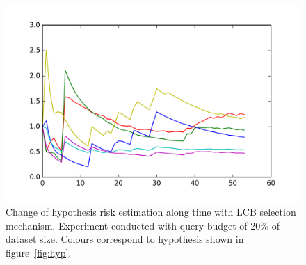 \documentclass[12pt, a4paper, pdflatex, leqno]{report}
\begin{document}
\begin{figure}[htbp]
  \centering
  \includegraphics[width=0.7\linewidth]{graphics/convergence_LCB025.png}
  \begin{tiny}
    \caption{Change of hypothesis risk estimation along time with LCB selection mechanism. Experiment conducted with query budget of 20\% of dataset size. Colours correspond to hypothesis shown in figure~\ref{fig:hyp}.\label{fig:LCB_conv}}
  \end{tiny}
  \vspace{1cm}
\end{figure}

\lipsum[0-3]
\end{document}
